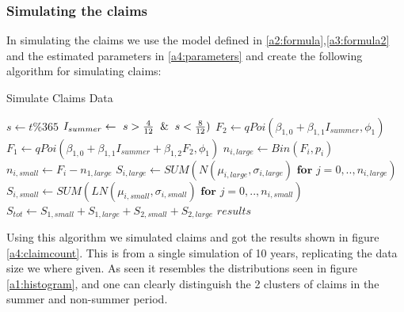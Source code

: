 \documentclass[11pt]{article}
\begin{document}
\subsubsection*{Simulating the claims}
In simulating the claims we use the model defined in \ref{a2:formula},\ref{a3:formula2} and the estimated parameters in \ref{a4:parameters} and create the following algorithm for simulating claims:

\begin{algorithm}
\caption{Simulate Claims Data}
\begin{algorithmic}[1]
            \State $s \gets t \% 365$
            \State $I_{summer} \gets \ s > \frac{4}{12} \And s < \frac{8}{12})$
            \State $F_2 \gets qPoi(\beta_{1,0}+\beta_{1,1}I_{summer},\phi_1)$
            \State $F_1 \gets qPoi(\beta_{1,0}+\beta_{1,1}I_{summer}+\beta_{1,2}F_2,\phi_1)$
                \State $n_{i,large} \gets Bin(F_i,p_i)$
                \State $n_{i,small} \gets F_i-n_{1,large}$
                \State $S_{i,large} \gets SUM( N(\mu_{i,large},\sigma_{i,large}) \textbf{ for } j = 0,..,n_{i,large}) $
                \State $S_{i,small} \gets SUM( LN(\mu_{i,small},\sigma_{i,small}) \textbf{ for } j = 0,..,n_{i,small} )$
        \EndFor
        \State $S_{tot} \gets S_{1,small} +S_{1,large} +S_{2,small} +S_{2,large} $
        \State \Return $results$
    \EndProcedure
\end{algorithmic}
\label{a4:alg}
\end{algorithm}

Using this algorithm we simulated claims and got the results shown in figure \ref{a4:claimcount}. 
This is from a single simulation of 10 years, replicating the data size we where given.
As seen it resembles the distributions seen in figure \ref{a1:histogram}, and one can clearly distinguish the 2 clusters of claims in the summer and non-summer period.
\end{document}
